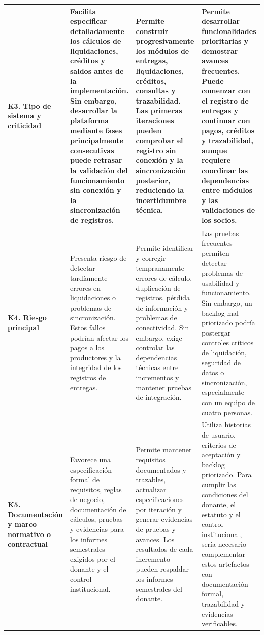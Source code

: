 \begin{longtable}{
|>{\raggedright\arraybackslash}p{}
|>{\raggedright\arraybackslash}p{}
|>{\raggedright\arraybackslash}p{}
|>{\raggedright\arraybackslash}p{}|}
\textbf{K3. Tipo de sistema y criticidad} &
Facilita especificar detalladamente los cálculos de liquidaciones, créditos y saldos antes de la implementación. Sin embargo, desarrollar la plataforma mediante fases principalmente consecutivas puede retrasar la validación del funcionamiento sin conexión y la sincronización de registros. &
Permite construir progresivamente los módulos de entregas, liquidaciones, créditos, consultas y trazabilidad. Las primeras iteraciones pueden comprobar el registro sin conexión y la sincronización posterior, reduciendo la incertidumbre técnica. &
Permite desarrollar funcionalidades prioritarias y demostrar avances frecuentes. Puede comenzar con el registro de entregas y continuar con pagos, créditos y trazabilidad, aunque requiere coordinar las dependencias entre módulos y las validaciones de los socios. \\
\hline

\textbf{K4. Riesgo principal} &
Presenta riesgo de detectar tardíamente errores en liquidaciones o problemas de sincronización. Estos fallos podrían afectar los pagos a los productores y la integridad de los registros de entregas. &
Permite identificar y corregir tempranamente errores de cálculo, duplicación de registros, pérdida de información y problemas de conectividad. Sin embargo, exige controlar las dependencias técnicas entre incrementos y mantener pruebas de integración. &
Las pruebas frecuentes permiten detectar problemas de usabilidad y funcionamiento. Sin embargo, un backlog mal priorizado podría postergar controles críticos de liquidación, seguridad de datos o sincronización, especialmente con un equipo de cuatro personas. \\
\hline

\textbf{K5. Documentación y marco normativo o contractual} &
Favorece una especificación formal de requisitos, reglas de negocio, documentación de cálculos, pruebas y evidencias para los informes semestrales exigidos por el donante y el control institucional. &
Permite mantener requisitos documentados y trazables, actualizar especificaciones por iteración y generar evidencias de pruebas y avances. Los resultados de cada incremento pueden respaldar los informes semestrales del donante. &
Utiliza historias de usuario, criterios de aceptación y backlog priorizado. Para cumplir las condiciones del donante, el estatuto y el control institucional, sería necesario complementar estos artefactos con documentación formal, trazabilidad y evidencias verificables. \\
\hline

\end{longtable}


